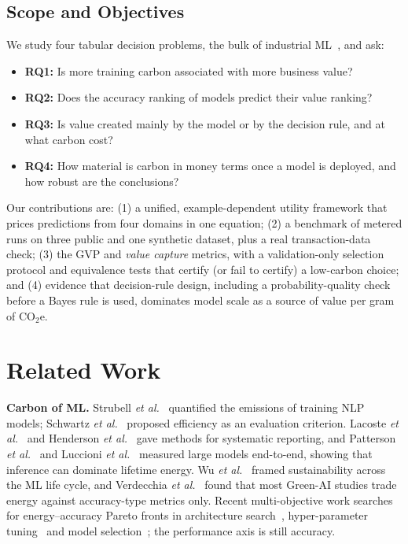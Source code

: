 \documentclass[conference]{IEEEtran}
\begin{document}
\subsection{Scope and Objectives}
We study four tabular decision problems, the bulk of industrial ML~\cite{grinsztajn2022}, and ask:
\begin{itemize}
\item \textbf{RQ1:} Is more training carbon associated with more business value?
\item \textbf{RQ2:} Does the accuracy ranking of models predict their value ranking?
\item \textbf{RQ3:} Is value created mainly by the model or by the decision rule, and at what carbon cost?
\item \textbf{RQ4:} How material is carbon in money terms once a model is deployed, and how robust are the conclusions?
\end{itemize}
Our contributions are: (1) a unified, example-dependent utility framework that prices predictions from four domains in
one equation; (2) a benchmark of \NRuns{} metered runs on three public and one synthetic dataset, plus a real
transaction-data check; (3) the GVP and \emph{value capture} metrics, with a validation-only selection protocol and
equivalence tests that certify (or fail to certify) a low-carbon choice; and (4) evidence that decision-rule design,
including a probability-quality check before a Bayes rule is used, dominates model scale as a source of value per gram
of CO$_2$e.

\section{Related Work}
\textbf{Carbon of ML.} Strubell \emph{et al.}~\cite{strubell2019} quantified the emissions of training NLP models;
Schwartz \emph{et al.}~\cite{schwartz2020} proposed efficiency as an evaluation criterion. Lacoste \emph{et
al.}~\cite{lacoste2019} and Henderson \emph{et al.}~\cite{henderson2020} gave methods for systematic reporting, and
Patterson \emph{et al.}~\cite{patterson2021} and Luccioni \emph{et al.}~\cite{luccioni2023,luccioni2024} measured large
models end-to-end, showing that inference can dominate lifetime energy. Wu \emph{et al.}~\cite{wu2022} framed
sustainability across the ML life cycle, and Verdecchia \emph{et al.}~\cite{verdecchia2023} found that most Green-AI
studies trade energy against accuracy-type metrics only. Recent multi-objective work searches for energy--accuracy
Pareto fronts in architecture search~\cite{ecnas2024}, hyper-parameter tuning~\cite{ecopt2026} and model
selection~\cite{betello2025}; the performance axis is still accuracy.
\end{document}
